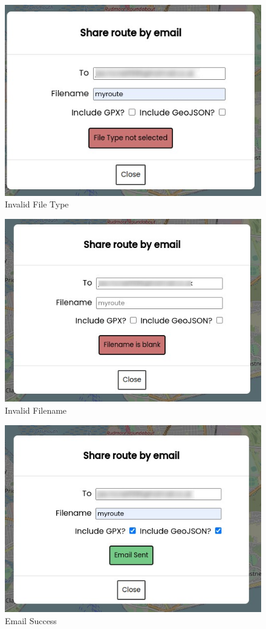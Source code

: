 \begin{figure}[!ht]
    \centering
    \includegraphics[width=425px]{figures/Progress Images/Iteration-2/SR17/SR17 Invalid File type.png}
    \caption{Invalid File Type}
    \label{fig:invalid-file}
\end{figure}

\begin{figure}[!ht]
    \centering
    \includegraphics[width=425px]{figures/Progress Images/Iteration-2/SR17/SR17 Invalid Filename.png}
    \caption{Invalid Filename}
    \label{fig:invalid-filename}
\end{figure}

\begin{figure}[!ht]
    \centering
    \includegraphics[width=425px]{figures/Progress Images/Iteration-2/SR17/SR17 Success.png}
    \caption{Email Success}
    \label{fig:email-success}
\end{figure}

